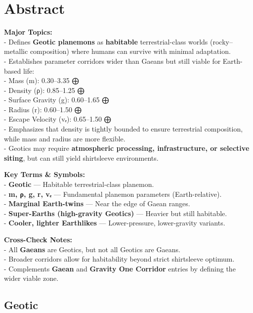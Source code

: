 \documentclass[
  letterpaper,
]{book}
\begin{document}
\chapter{Abstract}\label{abstract-18}

\textbf{Major Topics:}\\
- Defines \textbf{Geotic planemons} as \textbf{habitable}
terrestrial-class worlds (rocky--metallic composition) where humans can
survive with minimal adaptation.\\
- Establishes parameter corridors wider than Gaeans but still viable for
Earth-based life:\\
- Mass (m): 0.30--3.35 ⨁\\
- Density (ρ): 0.85--1.25 ⨁\\
- Surface Gravity (g): 0.60--1.65 ⨁\\
- Radius (r): 0.60--1.50 ⨁\\
- Escape Velocity (vₑ): 0.65--1.50 ⨁\\
- Emphasizes that density is tightly bounded to ensure terrestrial
composition, while mass and radius are more flexible.\\
- Geotics may require \textbf{atmospheric processing, infrastructure, or
selective siting}, but can still yield shirtsleeve environments.

\textbf{Key Terms \& Symbols:}\\
- \textbf{Geotic} --- Habitable terrestrial-class planemon.\\
- \textbf{m, ρ, g, r, vₑ} --- Fundamental planemon parameters
(Earth-relative).\\
- \textbf{Marginal Earth-twins} --- Near the edge of Gaean ranges.\\
- \textbf{Super-Earths (high-gravity Geotics)} --- Heavier but still
habitable.\\
- \textbf{Cooler, lighter Earthlikes} --- Lower-pressure, lower-gravity
variants.

\textbf{Cross-Check Notes:}\\
- All \textbf{Gaeans} are Geotics, but not all Geotics are Gaeans.\\
- Broader corridors allow for habitability beyond strict shirtsleeve
optimum.\\
- Complements \textbf{Gaean} and \textbf{Gravity One Corridor} entries
by defining the wider viable zone.

\section{Geotic}\label{geotic}
\end{document}
